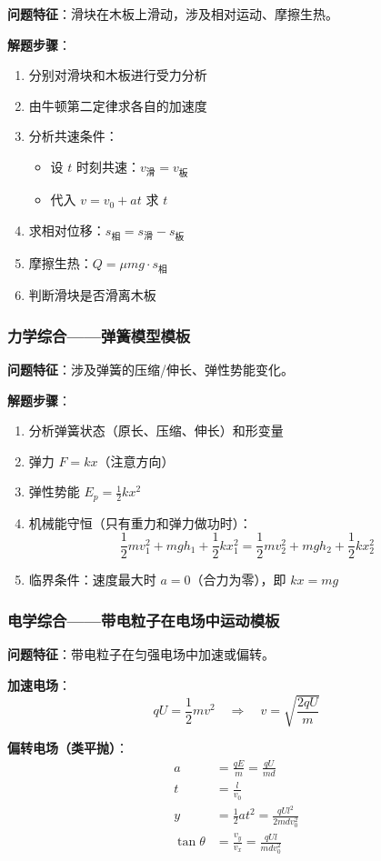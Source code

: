\textbf{问题特征}：滑块在木板上滑动，涉及相对运动、摩擦生热。

\textbf{解题步骤}：
\begin{enumerate}
  \item 分别对滑块和木板进行受力分析
  \item 由牛顿第二定律求各自的加速度
  \item 分析共速条件：
    \begin{itemize}
      \item 设 $t$ 时刻共速：$v_{\text{滑}} = v_{\text{板}}$
      \item 代入 $v = v_0 + at$ 求 $t$
    \end{itemize}
  \item 求相对位移：$s_{\text{相}} = s_{\text{滑}} - s_{\text{板}}$
  \item 摩擦生热：$Q = \mu mg\cdot s_{\text{相}}$
  \item 判断滑块是否滑离木板
\end{enumerate}

\subsubsection{力学综合——弹簧模型模板}

\textbf{问题特征}：涉及弹簧的压缩/伸长、弹性势能变化。

\textbf{解题步骤}：
\begin{enumerate}
  \item 分析弹簧状态（原长、压缩、伸长）和形变量
  \item 弹力 $F = kx$（注意方向）
  \item 弹性势能 $E_p = \frac12 kx^2$
  \item 机械能守恒（只有重力和弹力做功时）：
    \[
    \frac12 mv_1^2 + mgh_1 + \frac12 kx_1^2 = \frac12 mv_2^2 + mgh_2 + \frac12 kx_2^2
    \]
  \item 临界条件：速度最大时 $a=0$（合力为零），即 $kx = mg$
\end{enumerate}

\subsubsection{电学综合——带电粒子在电场中运动模板}

\textbf{问题特征}：带电粒子在匀强电场中加速或偏转。

\textbf{加速电场}：
\[
qU = \frac12 mv^2 \quad\Rightarrow\quad v = \sqrt{\frac{2qU}{m}}
\]

\textbf{偏转电场（类平抛）}：
\[
\begin{aligned}
a &= \frac{qE}{m} = \frac{qU}{md} \\
t &= \frac{l}{v_0} \\
y &= \frac12 at^2 = \frac{qUl^2}{2mdv_0^2} \\
\tan\theta &= \frac{v_y}{v_x} = \frac{qUl}{mdv_0^2}
\end{aligned}
\]

